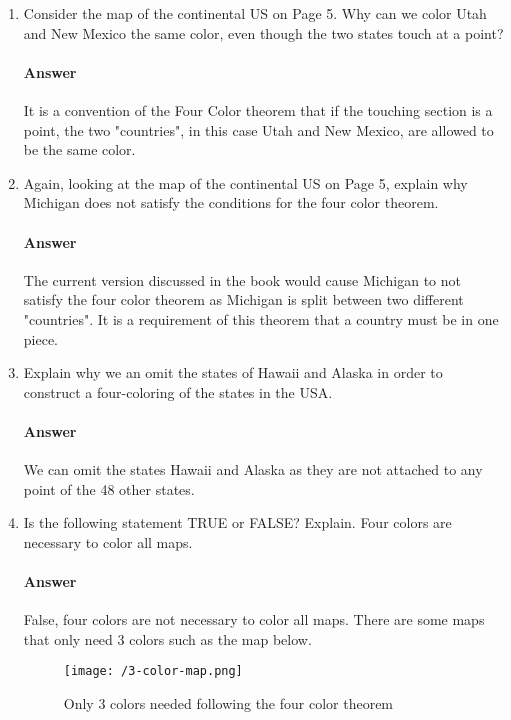 \documentclass{article}
\begin{document}
\begin{enumerate}

    \item Consider the map of the continental US on Page 5.  Why can we color
        Utah and New Mexico the same color, even though the two states touch at
        a point?

        \paragraph{Answer}
        It is a convention of the Four Color theorem that if the touching
        section is a point, the two "countries", in this case Utah and
        New Mexico, are allowed to be the same color.

    \item Again, looking at the map of the continental US on Page 5, explain why
        Michigan does not satisfy the conditions for the four color theorem.

        \paragraph{Answer}
        The current version discussed in the book would cause Michigan to
        not satisfy the four color theorem as Michigan is split between
        two different "countries".
        It is a requirement of this theorem that a country must be in one piece.

    \item Explain why we an omit the states of Hawaii and Alaska in order to
        construct a four-coloring of the states in the USA.

        \paragraph{Answer}
        We can omit the states Hawaii and Alaska as they are not attached
        to any point of the 48 other states.

    \item Is the following statement TRUE or FALSE?  Explain. Four colors are
        necessary to color all maps.

        \paragraph{Answer}
      False, four colors are not necessary to color all maps. There are
      some maps that only need 3 colors such as the map below.
      \begin{figure}
        \texttt{[image: /3-color-map.png]}
        \caption{Only 3 colors needed following the four color theorem}
        \label{fig:3ColorMap}
      \end{figure}



\end{enumerate}
\end{document}
